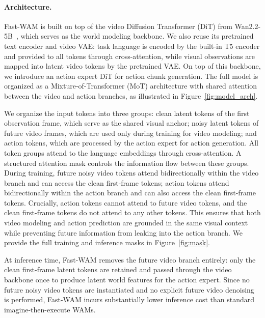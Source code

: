 \paragraph{Architecture.}
Fast-WAM is built on top of the video Diffusion Transformer (DiT) from Wan2.2-5B~\cite{wan2025}, which serves as the world modeling backbone. We also reuse its pretrained text encoder and video VAE: task language is encoded by the built-in T5 encoder and provided to all tokens through cross-attention, while visual observations are mapped into latent video tokens by the pretrained VAE. On top of this backbone, we introduce an action expert DiT for action chunk generation. The full model is organized as a Mixture-of-Transformer (MoT) architecture with shared attention between the video and action branches, as illustrated in Figure~\ref{fig:model_arch}.

We organize the input tokens into three groups: clean latent tokens of the first observation frame, which serve as the shared visual anchor; noisy latent tokens of future video frames, which are used only during training for video modeling; and action tokens, which are processed by the action expert for action generation. All token groups attend to the language embeddings through cross-attention. A structured attention mask controls the information flow between these groups. During training, future noisy video tokens attend bidirectionally within the video branch and can access the clean first-frame tokens; action tokens attend bidirectionally within the action branch and can also access the clean first-frame tokens. Crucially, action tokens cannot attend to future video tokens, and the clean first-frame tokens do not attend to any other tokens. This ensures that both video modeling and action prediction are grounded in the same visual context while preventing future information from leaking into the action branch. We provide the full training and inference masks in Figure~\ref{fig:mask}.

At inference time, Fast-WAM removes the future video branch entirely: only the clean first-frame latent tokens are retained and passed through the video backbone once to produce latent world features for the action expert. Since no future noisy video tokens are instantiated and no explicit future video denoising is performed, Fast-WAM incurs substantially lower inference cost than standard imagine-then-execute WAMs.


